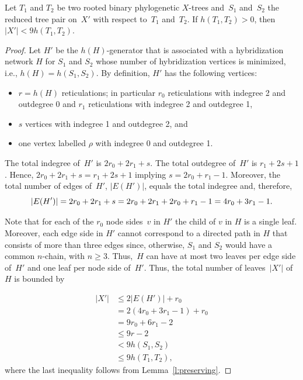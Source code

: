 \begin{theorem}\label{thm:newKernel}
Let $T_1$ and $T_2$ be two rooted binary phylogenetic $X$-trees and~$S_1$ and~$S_2$ the reduced tree pair on~$X'$ with respect to~$T_1$ and~$T_2$. If $h(T_1,T_2)>0$, then $|X'|< 9h(T_1,T_2)$.
\end{theorem}
\begin{proof}
Let $H'$ be the $h(H)$-generator that is associated with a hybridization network $H$ for $S_1$ and $S_2$ whose number of hybridization vertices is minimized, i.e., $h(H)=h(S_1,S_2)$. By definition, $H'$ has the following vertices:
\begin{itemize}
\item $r=h(H)$ reticulations; in particular $r_0$ reticulations with indegree 2 and outdegree 0 and $r_1$ reticulations with indegree 2 and outdegree 1,
\item $s$ vertices with indegree 1 and outdegree 2, and
\item one {vertex labelled $\rho$} with indegree 0 and outdegree 1.
\end{itemize}
The total indegree of~$H'$ is $2r_0 + 2r_1 + s$. The total outdegree of~$H'$ is $ r_1 + 2s + 1$. Hence, $2r_0 + 2r_1 + s = r_1 + 2s + 1$ implying $s = 2r_0 + r_1 - 1$. Moreover, the total number of edges of~$H'$, $|E(H')|$, equals the total indegree and, therefore,
\begin{equation}\label{eq:edges}
|E(H')|=2r_0 + 2r_1 + s=2r_0 + 2r_1 +2r_0 + r_1 - 1=4r_0+3r_1-1.\\
\end{equation}

Note that for each of the $r_0$ node sides~$v$ in $H'$ the child of $v$ in $H$ is a single leaf. Moreover, each edge side in $H'$ cannot correspond to a directed path in $H$ that consists of more than three edges since, otherwise, $S_1$ and $S_2$ would have a common $n$-chain, with $n\geq 3$. Thus,~$H$ can have at most two leaves per edge side of~$H'$ and one leaf per node side of~$H'$. Thus, the total number of leaves~$|X'|$ of~$H$ is bounded by

\begin{align*}
|X'|&\leq 2|E(H')| + r_0 \\
&= 2(4r_0 + 3r_1 - 1) + r_0\\
&= 9r_0 + 6r_1 - 2\\
& \leq 9r - 2\\
&< 9h(S_1,S_2)\\
&\leq 9h(T_1,T_2),
\end{align*}
where the last inequality follows from Lemma~\ref{l:preserving}.
\end{proof}






